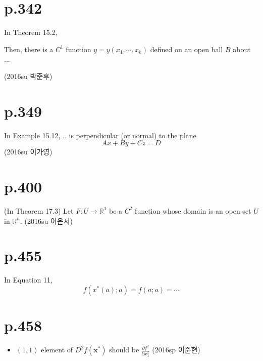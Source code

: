 \documentclass[a4paper]{article}
\begin{document}
\section{p.342} %
\label{sec:p_342}
In Theorem 15.2, 

Then, there is a $C^1$ function $y=y(x_1,\cdots,x_k)$ defined on an open ball $B$ about ... 

(2016su 박준후)

\section{p.349} %
\label{sec:p_349}
In Example 15.12, .. is perpendicular (or normal) to the plane\[
	Ax+By+Cz=D
\](2016su 이가영)

\section{p.400} %
\label{sec:p_400}
(In Theorem 17.3) Let $F:U\rightarrow \mathbb{R}^1$ be a $C^2$ function whose domain is an open set $U$ in $\mathbb{R}^n$. 
(2016su 이은지)

\section{p.455} %
\label{sec:p_455}
In Equation 11, \[
	f(x^\ast(a);a)=f(a;a)= \cdots
\]

\section{p.458} %
\label{sec:p_458}

\begin{itemize}
	\item $(1,1)$ element of $D^2 f(\mathbf{x^\ast})$ should be $\frac{\partial f^2}{\partial x_1^2}$ (2016sp 이준현)
\end{itemize}

\end{document}
